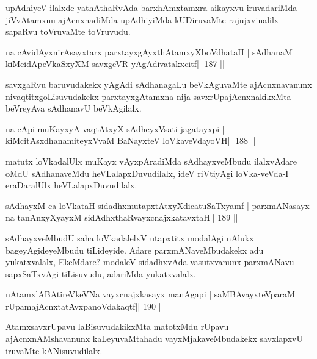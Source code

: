 \begin{artha}
upAdhiyeV ilalxde yathAthaRvAda barxhAmxtamxra aikayxvu iruvadariMda jiVvAtamxnu ajAcnxnadiMda upAdhiyiMda kUDiruvaMte rajujxvinalilx sapaRvu toVruvaMte toVruvudu.
\end{artha}

\begin{shl}
na cAvidAyxnirAsayxtarx parxtayxgAyxthAtamxyXboVdhataH |
sAdhanaM kiMcidApeVkaSxyXM savxgeVR yAgAdivatakxcitf\hfill || 187 ||
\end{shl}

\begin{artha}
savxgaRvu baruvudakekx yAgAdi sAdhanagaLu beVkAguvaMte ajAcnxnavanunx nivaqtitxgoLisuvudakekx parxtayxgAtamxna nija savxrUpajAcnxnakikxMta beVreyAva sAdhanavU beVkAgilalx.
\end{artha}

\begin{shl}
na cApi muKayxyA vaqtAtxyX sAdheyxV\s sati jagatayxpi |
kiMcitAsxdhanamiteyxVvaM BaNayxteV loVkaveVdayoVH\hfill || 188 ||
\end{shl}

\begin{artha}
matutx loVkadalUlx muKayx vAyxpAradiMda sAdhayxveMbudu ilalxvAdare oMdU sAdhanaveMdu heVLalapxDuvudilalx, ideV riVtiyAgi loVka-veVda-I eraDaralUlx heVLalapxDuvudilalx.
\end{artha}

\begin{shl}
sAdhayxM ca loVkataH sidadhxmutapxtAtxyXdicatuSaTxyamf |
parxmANasayx na tanAnxyXyayxM sidAdhxthaRvayxcnajxkatavxtaH\hfill || 189 ||
\end{shl}

\begin{artha}
sAdhayxveMbudU saha loVkadalelxV utapxtitx modalAgi nAlukx bageyAgideyeMbudu tiLideyide. Adare parxmANaveMbudakekx adu yukatxvalalx, EkeMdare? modaleV sidadhxvAda vasutxvanunx parxmANavu sapxSaTxvAgi tiLisuvudu, adariMda yukatxvalalx.
\end{artha}


\begin{shl}
nA\s\s tamxlABAtireVkeVNa vayxcnajxkasayx manAgapi |
saMBAvayxteV\s paraM rUpamajAcnxtatAvxpanoVdakaqtf\hfill || 190 ||
\end{shl}

\begin{artha}
AtamxsavxrUpavu laBisuvudakikxMta matotxMdu rUpavu ajAcnxnAMshavanunx kaLeyuvaMtahadu vayxMjakaveMbudakekx savxlapxvU iruvaMte kANisuvudilalx.
\end{artha}

